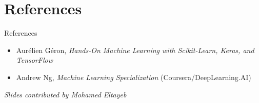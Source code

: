 \section{References}
\begin{frame}{References}
    \begin{itemize}
        \item Aurélien Géron, \textit{Hands-On Machine Learning with Scikit-Learn, Keras, and TensorFlow}
        \item Andrew Ng, \textit{Machine Learning Specialization} (Coursera/DeepLearning.AI)
    \end{itemize}

    \vspace{2em}
    
    \begin{flushleft}
        \small\textit{Slides contributed by Mohamed Eltayeb}
    \end{flushleft}
    
\end{frame}
